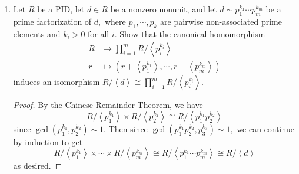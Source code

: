 \documentclass{article}
\begin{document}
\begin{enumerate}
	\item Let $R$ be a PID, let $d\in R$ be a nonzero nonunit, and let $d\sim p_1^{k_1} \cdots p_m^{k_m}$ be a prime factorization of $d,$ where $p_1, \cdots, p_k$ are pairwise non-associated prime elements and $k_i>0$ for all $i.$ Show that the canonical homomorphism
		\begin{align*}
			R &\to \prod_{i=1}^{m} R/\left< p_i^{k_i}\right> \\
			r &\mapsto \left(r+\left< p_1^{k_1}\right>, \cdots, r+\left< p_m^{k_m}\right>\right)
		\end{align*}
		induces an isomorphism $R/\left< d\right>\cong \prod_{i=1}^{m} R/\left< p_i^{k_i}\right>.$ 
		\begin{proof}
			By the Chinese Remainder Theorem, we have
			\[R/\left< p_1^{k_1}\right>\times R/\left< p_2^{k_2}\right>\cong R/\left< p_1^{k_1} p_2^{k_2}\right>\]
			since $\gcd\left(p_1^{k_1}, p_2^{k_2}\right)\sim 1.$ Then since $\gcd\left( p_1^{k_1}p_2^{k_2}, p_3^{k_3} \right)\sim 1,$ we can continue by induction to get
			\[R/\left< p_1^{k_1}\right>\times\cdots\times R/\left< p_m^{k_m}\right>\cong R/\left< p_1^{k_1}\cdots p_m^{k_m}\right>\cong R/\left< d\right>\]
			as desired.
		\end{proof}


\end{enumerate}
\end{document}
